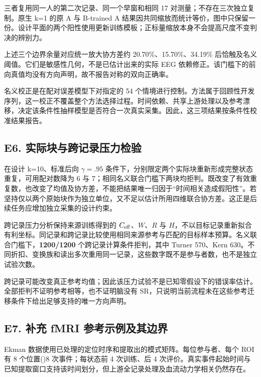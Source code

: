 \documentclass[11pt,a4paper]{article}
\begin{document}
\endgroup

三者复用同一人的第二次记录、同一个早窗和相同 17
对测量；不存在三次独立复制。原生 k=1 的原 A 与 B-trained A
结果因共同缩放而统计等价，图中只保留一份。设计平面的两个阳性使用更新训练模板；正标量缩放本身不会提高尺度不变判决的辨别力。

上述三个边界余量对应统一放大协方差约 20.70\%、15.70\%、34.19\%
后恰触及名义阈值。它们是敏感性几何，不是已估计出来的实际 EEG
依赖修正。该门槛下的前向真值均没有方向声明，故不报告对称的双向正确率。

名义校正是在配对误差模型下对指定的 54
个情境进行控制。方法属于回顾性开发序列，这一校正不覆盖整个方法选择过程。时间依赖、共享上游处理以及参考漂移，决定该条件性抽样模型是否符合一次真实采集。因此，这三项结果按条件性校准结果报告。

\subsection{E6.
实际块与跨记录压力检验}\label{e6.-ux5b9eux9645ux5757ux4e0eux8de8ux8bb0ux5f55ux538bux529bux68c0ux9a8c}

在设计 k=10、标准后向 \(\gamma=.95\)
条件下，分别限定两个实际块重新形成完整状态重复，可用配对数降为 6 与
7；相同名义联合门槛下两块均拒判。既改变了有效重复数，也改变了均值及协方差，不能把结果唯一归因于“时间相关造成假阳性”。若坚持仅以两个原始块作为独立单位，又不足以估计所用四维联合协方差。这正是后续任务应增加独立采集的设计约束。

跨记录压力分析保持来源训练得到的 \(C_{\rm eff}\)、\(W\)、\(R\) 与
\(H\)，不以目标记录重新拟合有利坐标。同记录和跨记录比较使用相同来源参考与匹配的目标样本预算。名义联合门槛下，\textbf{1200/1200}
个跨记录计算条件拒判，其中 Turner 570、Kern
630。不同折扣、变换族和读出多次重用同一记录，这些数字既不是参与者数，也不是独立试验次数。

跨记录可能改变真正参考均值；因此该压力试验不是已知零假设下的错误率估计。全部拒判不证明参考相等，也不证明脑没有
SR，只说明当前流程未在这些参考迁移条件下给出足够支持的唯一方向声明。

\subsection{E7. 补充 fMRI
参考示例及其边界}\label{e7.-ux8865ux5145-fmri-ux53c2ux8003ux793aux4f8bux53caux5176ux8fb9ux754c}

Ekman 数据使用已处理的定位时序和提取出的模式矩阵。每位参与者、每个 ROI
有 8 个位置(\times)8 次事件；每状态前 4 次训练、后 4
次评价。真实事件起始时间与已知提取窗口支持该时间划分，但上游全记录处理及血流动力学相关仍然存在。
\end{document}
